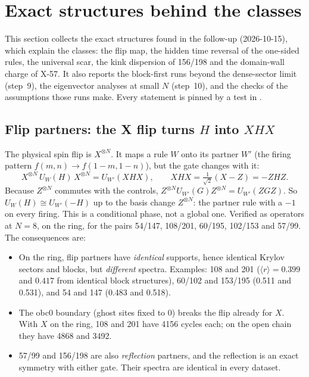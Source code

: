 \section{Exact structures behind the classes}
\label{sec:answers}
This section collects the exact structures found in the follow-up (2026-10-15), which explain the classes: the flip map,
the hidden time reversal of the one-sided rules, the universal scar, the kink dispersion of 156/198 and the domain-wall
charge of X-57. It also reports the block-first runs beyond the dense-sector limit (step~9), the eigenvector analyses at
small $N$ (step~10), and the checks of the assumptions those runs make. Every statement is pinned by a test in
.

\subsection{Flip partners: the X flip turns $H$ into $XHX$}
The physical spin flip is $X^{\otimes N}$. It maps a rule $W$ onto its partner $W'$ (the firing pattern
$f(m,n)\to f(1-m,1-n)$), but the gate changes with it:
\begin{equation}
  X^{\otimes N}\,U_W(H)\,X^{\otimes N}=U_{W'}(XHX),\qquad XHX=\tfrac{1}{\sqrt2}(X-Z)=-ZHZ .
\end{equation}
Because $Z^{\otimes N}$ commutes with the controls, $Z^{\otimes N}U_{W'}(G)Z^{\otimes N}=U_{W'}(ZGZ)$. So
$U_W(H)\cong U_{W'}(-H)$ up to the basis change $Z^{\otimes N}$: the partner rule with a $-1$ on every firing. This is a
conditional phase, not a global one. Verified as operators at $N=8$, on the ring, for the pairs 54/147, 108/201, 60/195,
102/153 and 57/99. The consequences are:
\begin{itemize}
\item On the ring, flip partners have \emph{identical} supports, hence identical Krylov sectors and blocks, but
  \emph{different} spectra. Examples: 108 and 201 ($\langle r\rangle=0.399$ and $0.417$ from identical block structures),
  60/102 and 153/195 (0.511 and 0.531), and 54 and 147 (0.483 and 0.518).
\item The obc0 boundary (ghost sites fixed to $0$) breaks the flip already for $X$. With $X$ on the ring, 108 and 201 have
  4156 cycles each; on the open chain they have 4868 and 3492.
\item 57/99 and 156/198 are also \emph{reflection} partners, and the reflection is an exact symmetry with either gate.
  Their spectra are identical in every dataset.
\end{itemize}

